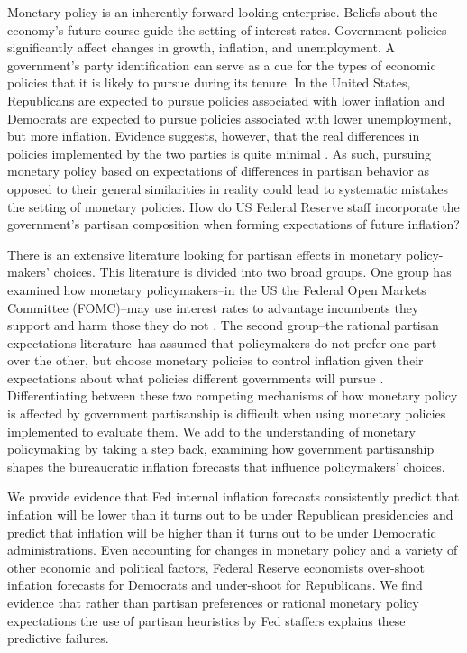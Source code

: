 \documentclass[a4paper]{article}\usepackage{graphicx, color}
\begin{document}
\vspace{0.3cm}


Monetary policy is an inherently forward looking enterprise. Beliefs about the economy's future course guide the setting of interest rates. Government policies significantly affect changes in growth, inflation, and unemployment. A government's party identification can serve as a cue for the types of economic policies that it is likely to pursue during its tenure. In the United States, Republicans are expected to pursue policies associated with lower inflation and Democrats are expected to pursue policies associated with lower unemployment, but more inflation. Evidence suggests, however, that the real differences in policies implemented by the two parties is quite minimal \citep{Bartels2008}. As such, pursuing monetary policy based on expectations of differences in partisan behavior as opposed to their general similarities in reality could lead to systematic mistakes the setting of monetary policies. How do US Federal Reserve staff incorporate the government's partisan composition when forming expectations of future inflation?

There is an extensive literature looking for partisan effects in monetary policy-makers' choices. This literature is divided into two broad groups. One group has examined how monetary policymakers--in the US the Federal Open Markets Committee (FOMC)--may use interest rates to advantage incumbents they support and harm those they do not \citep{Clark2012,Hakes1988,Sieg1997,Tootell1996}. The second group--the rational partisan expectations literature--has assumed that policymakers do not prefer one part over the other, but choose monetary policies to control inflation given their expectations about what policies different governments will pursue \citep{Alesina1991,Hibbs1994}. Differentiating between these two competing mechanisms of how monetary policy is affected by government partisanship is difficult when using monetary policies implemented to evaluate them. We add to the understanding of monetary policymaking by taking a step back, examining how government partisanship shapes the bureaucratic inflation forecasts that influence policymakers' choices.

We provide evidence that Fed internal inflation forecasts consistently predict that inflation will be lower than it turns out to be under Republican presidencies and predict that inflation will be higher than it turns out to be under Democratic administrations. Even accounting for changes in monetary policy and a variety of other economic and political factors, Federal Reserve economists over-shoot inflation forecasts for Democrats and under-shoot for Republicans. We find evidence that rather than partisan preferences or rational monetary policy expectations the use of partisan heuristics by Fed staffers explains these predictive failures.
\end{document}
